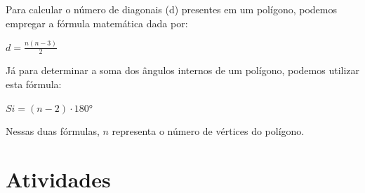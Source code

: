 {{{Para calcular o número de diagonais (d) presentes em um polígono, podemos empregar a fórmula matemática dada por:

$d = \frac{n(n - 3)}{2}$

Já para determinar a soma dos ângulos internos de um polígono, podemos utilizar esta fórmula:

$Si = (n - 2) \cdot 180°$

Nessas duas fórmulas, $n$ representa o número de vértices do polígono.
}

\section*{Atividades}










}}
